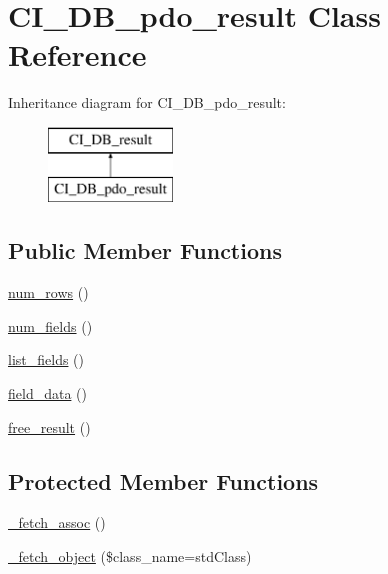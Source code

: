 \hypertarget{class_c_i___d_b__pdo__result}{}\section{C\+I\+\_\+\+D\+B\+\_\+pdo\+\_\+result Class Reference}
\label{class_c_i___d_b__pdo__result}
Inheritance diagram for C\+I\+\_\+\+D\+B\+\_\+pdo\+\_\+result\+:\begin{figure}[H]
\begin{center}
\leavevmode
\includegraphics[height=2.000000cm]{class_c_i___d_b__pdo__result}
\end{center}
\end{figure}
\subsection*{Public Member Functions}
\begin{DoxyCompactItemize}
\item 
\mbox{\hyperlink{class_c_i___d_b__pdo__result_a218657c303ee499b97710ab0cd2f5d6e}{num\+\_\+rows}} ()
\item 
\mbox{\hyperlink{class_c_i___d_b__pdo__result_af831bf363e4d7d661a717a4932af449d}{num\+\_\+fields}} ()
\item 
\mbox{\hyperlink{class_c_i___d_b__pdo__result_a50b54eb4ea7cfd039740f532988ea776}{list\+\_\+fields}} ()
\item 
\mbox{\hyperlink{class_c_i___d_b__pdo__result_a84bffd65e53902ade1591716749a33e3}{field\+\_\+data}} ()
\item 
\mbox{\hyperlink{class_c_i___d_b__pdo__result_aad2d98d6beb3d6095405356c6107b473}{free\+\_\+result}} ()
\end{DoxyCompactItemize}
\subsection*{Protected Member Functions}
\begin{DoxyCompactItemize}
\item 
\mbox{\hyperlink{class_c_i___d_b__pdo__result_a43a9a92817f1334a1c10752ec44275a0}{\+\_\+fetch\+\_\+assoc}} ()
\item 
\mbox{\hyperlink{class_c_i___d_b__pdo__result_a60806be6a9c2488820813c2a7f4fef71}{\+\_\+fetch\+\_\+object}} (\$class\+\_\+name=\textquotesingle{}std\+Class\textquotesingle{})
\end{DoxyCompactItemize}
